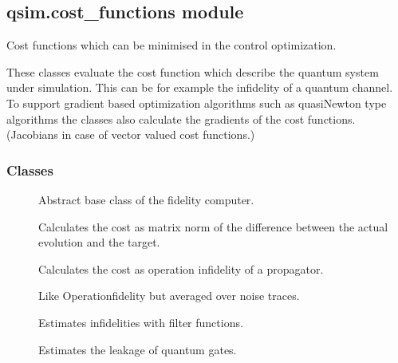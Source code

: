 \documentclass[letterpaper,10pt,english]{sphinxmanual}
\begin{document}
\subsection{qsim.cost\_functions module}
\label{\detokenize{qsim:module-qsim.cost_functions}}\label{\detokenize{qsim:qsim-cost-functions-module}}
Cost functions which can be minimised in the control optimization.

These classes evaluate the cost function which describe the quantum system
under simulation. This can be for example the infidelity of a quantum channel.
To support gradient based optimization algorithms such as quasi\sphinxhyphen{}Newton type
algorithms the classes also calculate the gradients of the cost functions.
(Jacobians in case of vector valued cost functions.)


\subsubsection{Classes}
\label{\detokenize{qsim:id4}}\begin{description}
\item[{{\hyperref[\detokenize{qsim:qsim.cost_functions.CostFunction}]{}}}] \leavevmode
Abstract base class of the fidelity computer.

\item[{{\hyperref[\detokenize{qsim:qsim.cost_functions.OperatorMatrixNorm}]{}}}] \leavevmode
Calculates the cost as matrix norm of the difference between the actual
evolution and the target.

\item[{{\hyperref[\detokenize{qsim:qsim.cost_functions.OperationInfidelity}]{}}}] \leavevmode
Calculates the cost as operation infidelity of a propagator.

\item[{{\hyperref[\detokenize{qsim:qsim.cost_functions.OperationNoiseInfidelity}]{}}}] \leavevmode
Like Operationfidelity but averaged over noise traces.

\item[{{\hyperref[\detokenize{qsim:qsim.cost_functions.OperatorFilterFunctionInfidelity}]{}}}] \leavevmode
Estimates infidelities with filter functions.

\item[{{\hyperref[\detokenize{qsim:qsim.cost_functions.LeakageError}]{}}}] \leavevmode
Estimates the leakage of quantum gates.

\end{description}
\end{document}
